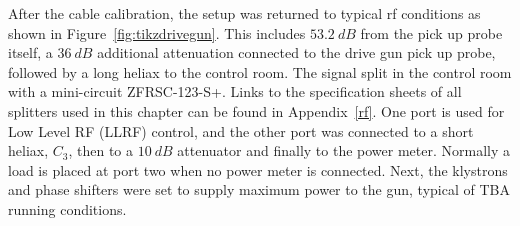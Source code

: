 \label{gunenergy}
After the cable calibration, the setup was returned to typical rf conditions as 
shown in Figure~\ref{fig:tikzdrivegun}. This includes $\SI{53.2}{dB}$ from the pick 
up probe itself, a $\SI{36}{dB}$ additional attenuation connected to the 
drive gun pick up probe, followed by a long heliax to the 
control room. The signal split in the control room with a mini-circuit ZFRSC-123-S+. 
Links to the specification sheets of all splitters used in this chapter can be found in Appendix~\ref{rf}.
One port is used for Low Level RF (LLRF) control, and the other port was connected to a short 
heliax, $C_3$, then to a $\SI{10}{dB}$ attenuator and finally to the 
power meter. Normally a load is placed at port two when no power meter is connected. 
Next, the klystrons and phase shifters were set to supply 
maximum power to the gun, typical of TBA running conditions. 
\def \delayvertical {1.5}
\iftrue
